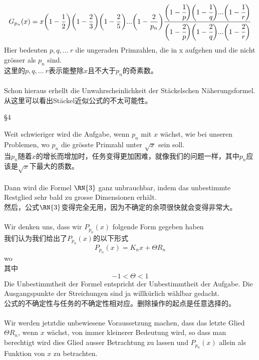 \documentclass[UTF8,a4paper,zihao=-4]{article}
\begin{document}
$$
G_{p_n}(x)=x\bigg(1-\frac{1}{2}\bigg)\bigg(1-\frac{2}{3}\bigg)\bigg(1-\frac{2}{5}\bigg)...\bigg(1-\frac{2}{p_n}\bigg)\frac{\bigg(1-\cfrac{1}{p}\bigg)\bigg(1-\cfrac{1}{q}\bigg)...\bigg(1-\cfrac{1}{r}\bigg)}{\bigg(1-\cfrac{2}{p}\bigg)\bigg(1-\cfrac{2}{q}\bigg)...\bigg(1-\cfrac{2}{r}\bigg)}
$$
\indent Hier bedeuten $p,q,...\ r$ die ungeraden Primzahlen, die in
x aufgehen und die nicht grösser als $p_n$ sind.\\
\indent 这里的$p,q,...\ r$表示能整除$x$且不大于$p_n$的奇素数。\\\\
\indent Schon hieraus erhellt die Unwahrscheinlichkeit der Stäckelschen Näherungsformel.\\
\indent 从这里可以看出Stäckel近似公式的不太可能性。
\vspace{2em}
\begin{center}§4\end{center}
\indent\indent Weit schwieriger wird die Aufgabe, wenn $p_n$ mit $x$ wächst, wie bei unseren Problemen, wo $p_n$ die grösste Primzahl unter $\sqrt{x}$ sein soll.\\
\indent 当$p_n$随着$x$的增长而增加时，任务变得更加困难，就像我们的问题一样，其中$p_n$应该是$\sqrt{x}$下最大的质数。\\\\
\indent Dann wird die Formel $\rm \RN{3}$ ganz unbrauchbar, indem das unbestimmte Restglied sehr bald zu grosse Dimensionen erhält.\\
\indent 然后，公式$\rm \RN{3}$变得完全无用，因为不确定的余项很快就会变得非常大。\\\\
\indent Wir denken uns, dass wir ${P_{p_n}(x)}$ folgende Form gegeben haben\\
\indent 我们认为我们给出了${P_{p_n}(x)}$的以下形式
$$
P_{p_n}(x)=K_nx+\Theta R_n
$$
wo\\
其中\\
$$
-1<\Theta<1
$$
\indent Die Unbestimmtheit der Formel entspricht der Unbestimmtheit der Aufgabe. Die Ausgangspunkte der Streichungen sind ja willkürlich wählbar gedacht.\\
\indent 公式的不确定性与任务的不确定性相对应。删除操作的起点是任意选择的。\\\\
\indent Wir werden jetztdie unbewiesene Voraussetzung machen, dass
das letzte Glied $\Theta R_n$, wenn $x$ wächst, von immer kleinerer Bedeutung wird, so dass man berechtigt wird dies Glied ausser Betrachtung zu lassen und $P_{p_n}(x)$ allein als Funktion von $x$ zu betrachten.\\
\end{document}
